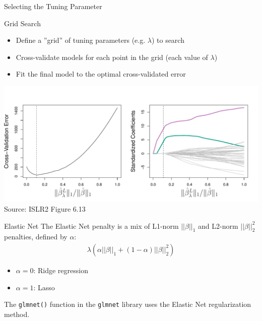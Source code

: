 \documentclass[ignorenonframetext,xcolor=x11names]{beamer}
\begin{document}
\begin{frame}{Selecting the Tuning Parameter}
\begin{block}{Grid Search}
\begin{itemize} 
   \item Define a ''grid'' of tuning parameters (e.g. $\lambda$) to search
   \item Cross-validate models for each point in the grid (each value of $\lambda$)
   \item Fit the final model to the optimal cross-validated error
\end{itemize}
\end{block}
\centering
\includegraphics[width=\textwidth]{../class11/Figures_Chapters_1-6/Chapter6/6_13.pdf} \\

\scriptsize Source: ISLR2 Figure 6.13
\end{frame}

\begin{frame}{Elastic Net}
The Elastic Net penalty is a mix of L1-norm $||\beta||_1$ and L2-norm $||\beta||_2^2$ penalties, defined by $\alpha$:
\begin{align*}
\lambda \left( \alpha ||\beta||_1  + (1-\alpha)||\beta||_2^2 \right)
\end{align*}
\vspace{-.5\baselineskip}
\begin{itemize}
\item $\alpha = 0$: Ridge regression
\item $\alpha = 1$: Lasso
\end{itemize}

\vspace{.5\baselineskip}
The \texttt{glmnet()} function in the \texttt{glmnet} library uses the Elastic Net regularization method.\end{frame}
\end{document}
